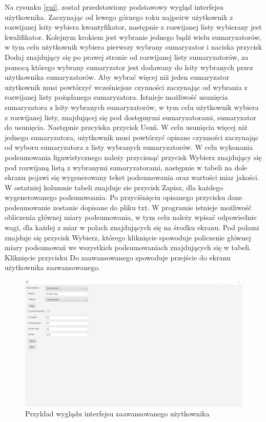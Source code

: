 \documentclass{classrep}
\begin{document}
Na rysunku \ref{gui}. został przedstawiony podstawowy wygląd interfejsu użytkownika. Zaczynając od lewego górnego roku najpeirw użytkownik z rozwijanej lsity wybiera kwantyfikator, następnie z rozwijanej listy wybierany jest kwalifikator. Kolejnym krokiem jest wybranie jednego bądź wielu sumaryzatorów, w tym celu użytkownik wybiera pierwszy wybrany sumaryzator i naciska przycisk Dodaj znajdujący się po prawej stronie od rozwijanej listy sumaryzatorów, za pomocą którego wybrany sumaryzator jest dodawany do lsity wybranych przez użytkownika sumaryzatorów. Aby wybrać więcej niż jeden sumaryzator użytkownik musi powtórzyć wcześniejsze czynności zaczynając od wybrania z rozwijanej listy pożądanego sumaryzatora. Istnieje możliwość usunięcia sumaryzatora z lsity wybranych sumaryzatorów, w tym celu użytkownik wybiera z rozwijanej listy, znajdującej się pod dostępnymi sumaryzatorami, sumaryzator do usunięcia. Następnie przcyiska przycisk Usuń. W celu usunięcia więcej niż jednego sumaryzatora, użytkownik musi powtórzyć opisane czynności zaczynając od wyboru sumaryzatora z listy wybranych sumaryzatorów. W celu wykonania podsumowania lignwistycznego należy przycisnąć przycisk Wybierz znajdujący się pod rozwijaną listą z wybranymi sumaryzatorami, następnie w tabeli na dole ekranu pojawi się wygenerowany tekst podsumowania oraz wartości miar jakości. W ostatniej kolumnie tabeli znajduje sie przycisk Zapisz, dla każdego wygenerowanego podsumwoania. Po przyciśnięciu opisanego przycisku dane podsumowanie zostanie dopisane do pliku txt. W programie istnieje możliwość obliczenia głównej miary podsumowania, w tym celu należy wpisać odpowiednie wagi, dla każdej z miar w polach znajdujących się na środku ekranu. Pod polami znajduje się przycisk Wybierz, którego kliknięcie spowoduje policzenie głównej miary podsumowań we wszystkich podsumowaniach znajdujących się w tabeli. Kliknięcie przycisku Do zaawansowanego spowoduje przejście do ekranu użytkownika zaawansowanego. 

\begin{figure}[h!]
 \centering
 \includegraphics[width=15cm]{gui_2.png}
 \vspace{-0.3cm}
 \caption{Przykład wyglądu interfejsu zaawansowanego użytkownika}
 \label{gui2}
\end{figure}
\end{document}
